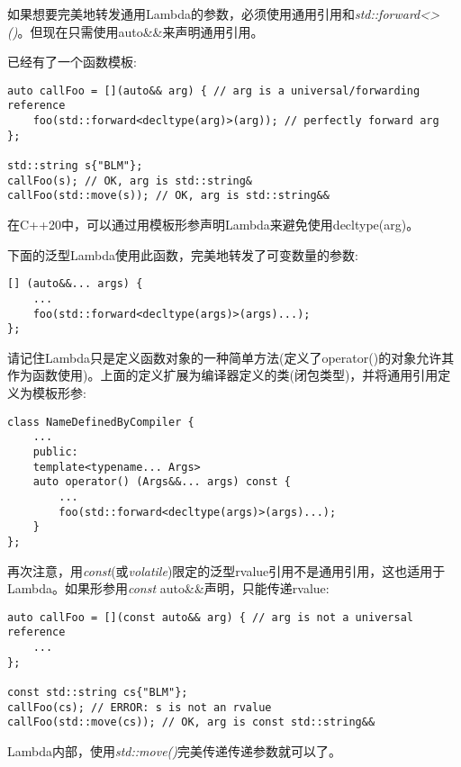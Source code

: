 如果想要完美地转发通用Lambda的参数，必须使用通用引用和\textit{std::forward<>()}。但现在只需使用auto\&\&来声明通用引用。\par

已经有了一个函数模板:\par

\begin{lstlisting}[caption={}]
auto callFoo = [](auto&& arg) { // arg is a universal/forwarding reference
	foo(std::forward<decltype(arg)>(arg)); // perfectly forward arg
};

std::string s{"BLM"};
callFoo(s); // OK, arg is std::string&
callFoo(std::move(s)); // OK, arg is std::string&&
\end{lstlisting}

在C++20中，可以通过用模板形参声明Lambda来避免使用decltype(arg)。\par

下面的泛型Lambda使用此函数，完美地转发了可变数量的参数:\par

\begin{lstlisting}[caption={}]
[] (auto&&... args) {
	...
	foo(std::forward<decltype(args)>(args)...);
};
\end{lstlisting}

请记住Lambda只是定义函数对象的一种简单方法(定义了operator()的对象允许其作为函数使用)。上面的定义扩展为编译器定义的类(闭包类型)，并将通用引用定义为模板形参:\par

\begin{lstlisting}[caption={}]
class NameDefinedByCompiler {
	...
	public:
	template<typename... Args>
	auto operator() (Args&&... args) const {
		...
		foo(std::forward<decltype(args)>(args)...);
	}
};
\end{lstlisting}

再次注意，用\textit{const}(或\textit{volatile})限定的泛型rvalue引用不是通用引用，这也适用于Lambda。如果形参用\textit{const} auto\&\&声明，只能传递rvalue:\par

\begin{lstlisting}[caption={}]
auto callFoo = [](const auto&& arg) { // arg is not a universal reference
	...
};

const std::string cs{"BLM"};
callFoo(cs); // ERROR: s is not an rvalue
callFoo(std::move(cs)); // OK, arg is const std::string&&
\end{lstlisting}

Lambda内部，使用\textit{std::move()}完美传递传递参数就可以了。\par
















































